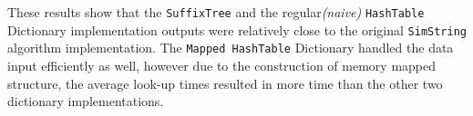 \begin{center}

\begin{table}[H]
  \caption{Average Look-up Time Results Based on First 200 Strings on CoNLL Data}
  \end{table}  
\end{center}

These results show that the \texttt{SuffixTree} and the regular\textit{(naive)} \texttt{HashTable} Dictionary implementation outputs were relatively close to the original \texttt{SimString} algorithm implementation. The \texttt{Mapped HashTable} Dictionary handled the data input efficiently as well, however due to the construction of memory mapped structure, the average look-up times resulted in more time than the other two dictionary implementations.



	
	